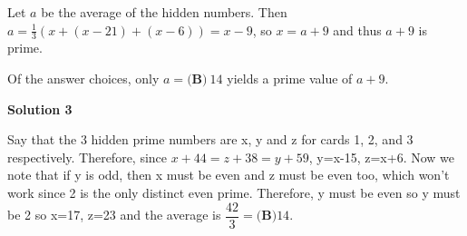 \begin{enumerate}
 Let $a$ be the average of the hidden numbers.  Then $a =\frac{1}{3}\left(x+(x-21)+(x-6)\right)=x-9$, so $x = a + 9$ and thus $a + 9$ is prime.

 Of the answer choices, only $a = \boxed{\textbf{(B)}\ 14}$ yields a prime value of $a + 9$.

 



\textbf{Solution 3}

Say that the 3 hidden prime numbers are x, y and z for cards 1, 2, and 3 respectively. Therefore, since $x+44 = z+38 = y+59$, y=x-15, z=x+6. Now we note that if y is odd, then x must be even and z must be even too, which won't work since 2 is the only distinct even prime. Therefore, y must be even so y must be 2 so x=17, z=23 and the average is  $\dfrac{42}{3}=\boxed{\textbf{(B)} 14}$.

 


\end{enumerate}